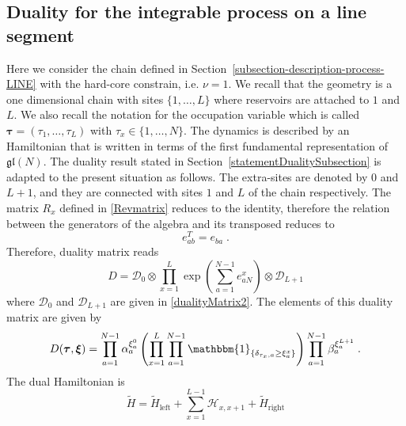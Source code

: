 \documentclass[10pt]{article}
\numberwithin{equation}{section}
\numberwithin{equation}{subsection}
\newcommand{\dt}{\;.}
\begin{document}
\subsection{Duality for the integrable process on a line segment}\label{integrableChain-duality}
Here we consider the chain defined in Section~\ref{subsection-description-process-LINE} with the hard-core constrain, i.e. $\nu=1$. 
We recall that the geometry is a one dimensional chain with sites $\{1,\ldots,L\}$ where reservoirs are attached to $1$ and $L$. 
We also recall the notation for the occupation variable which is called $\bm{\tau}=(\tau_1,\ldots,\tau_L)$ with $\tau_x\in\{1,\ldots,N\}$.
The dynamics is described by an Hamiltonian that is written in terms of the first fundamental representation of $\mathfrak{gl}(N)$. The duality result stated in Section~\ref{statementDualitySubsection} is adapted to the present situation as follows. 
The extra-sites are denoted by $0$ and $L+1$, and they are connected with sites $1$ and $L$ of the chain respectively. The matrix $R_{x}$ defined in \eqref{Revmatrix} 
reduces to the identity, therefore the relation between the generators of the algebra and its transposed reduces to
\begin{equation}\label{transpostionPropertyFund}
	e_{ab}^T= e_{ba}\dt
\end{equation}
Therefore, duality matrix reads
\begin{equation}
	D=\mathcal{D}_{0}\otimes\prod_{x=1}^{L}\exp{\left(\sum_{a=1}^{N-1}e_{aN}^{x}\right)}\otimes \mathcal{D}_{L+1}
\end{equation}
where $\mathcal{D}_{0}$ and $\mathcal{D}_{L+1}$ are given in \eqref{dualityMatrix2}. 
The elements of this duality matrix are given by
\begin{equation}\label{ElementsDualityMatrixChain_1}
	D(\bm{\tau},\bm{\xi})=\prod_{a=1}^{N-1}\alpha_{a}^{\xi_{a}^{0}}\left(\prod_{x=1}^{L}\prod_{a=1}^{N-1}\mathbbm{1}_{\{\delta_{\tau_{x},a}\geq \xi_{a}^{x}\}}\right)\prod_{a=1}^{N-1}\beta_{a}^{\xi_{a}^{L+1}}\dt
\end{equation}
The dual Hamiltonian is
\begin{equation}
	\widetilde{H}=\widetilde{H}_{\text{left}}+\sum_{x=1}^{L-1}\mathcal{H}_{x,x+1}+\widetilde{H}_{\text{right}}
\end{equation}
\end{document}
